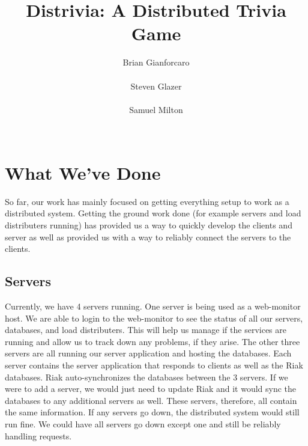 \documentclass{dependencies/acm_proc_article-sp}
\begin{document}
\title{ Distrivia: A Distributed Trivia Game }
\author{
\alignauthor
Brian Gianforcaro \\
       \\
\alignauthor
Steven Glazer \\
       \\
\alignauthor
Samuel Milton \\
       \\
}
\maketitle


\section {What We've Done}
So far, our work has mainly focused on getting everything setup to work as a
distributed system. Getting the ground work done (for example servers and load
distributers running) has provided us a way to quickly develop the clients
and server as well as provided us with a way to reliably connect the servers to
the clients.
\subsection {Servers}
Currently, we have 4 servers running. One server is being used as a web-monitor
host. We are able to login to the web-monitor to see the status of all our
servers, databases, and load distributers. This will help us manage if the services
are running and allow us to track down any problems, if they arise. The other three
servers are all running our server application and hosting the databases.
Each server contains the server application that responds to clients as well as
the Riak \cite{riak} databases. Riak auto-synchronizes the databases between the 3 servers. If
we were to add a server, we would just need to update Riak and it would sync the
databases to any additional servers as well. These servers, therefore, all contain
the same information. If any servers go down, the distributed system would still
run fine. We could have all servers go down except one and still be reliably
handling requests.
\end{document}
